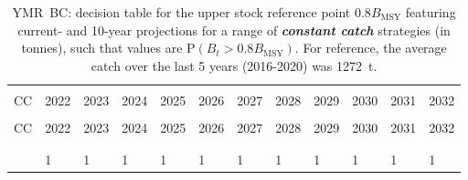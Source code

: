 \documentclass[11pt]{book}
\newcommand{\Bmsy}{B_\mathrm{MSY}}
\newcommand{\itbf}[1]{\textit{\textbf{#1}}}
\begin{document}
\begin{longtable}[c]{>{\raggedright\let\newline\\\arraybackslash\hspace{0pt}}p{0.48in}>{\raggedleft\let\newline\\\arraybackslash\hspace{0pt}}p{0.48in}>{\raggedleft\let\newline\\\arraybackslash\hspace{0pt}}p{0.48in}>{\raggedleft\let\newline\\\arraybackslash\hspace{0pt}}p{0.51in}>{\raggedleft\let\newline\\\arraybackslash\hspace{0pt}}p{0.51in}>{\raggedleft\let\newline\\\arraybackslash\hspace{0pt}}p{0.51in}>{\raggedleft\let\newline\\\arraybackslash\hspace{0pt}}p{0.51in}>{\raggedleft\let\newline\\\arraybackslash\hspace{0pt}}p{0.51in}>{\raggedleft\let\newline\\\arraybackslash\hspace{0pt}}p{0.51in}>{\raggedleft\let\newline\\\arraybackslash\hspace{0pt}}p{0.51in}>{\raggedleft\let\newline\\\arraybackslash\hspace{0pt}}p{0.51in}>{\raggedleft\let\newline\\\arraybackslash\hspace{0pt}}p{0.51in}}
  \caption{YMR~BC: decision table for the upper stock reference point $0.8 \Bmsy$ featuring current- and 10-year projections for a range of \itbf{constant catch} strategies (in tonnes), such that values are P$(B_t > 0.8 \Bmsy)$.  For reference, the average catch over the last 5 years (2016-2020) was 1272~t. } \label{tab:ymr.gmu.USR.CCs}\\  \hline\\[-2.2ex]  CC  & 2022 & 2023 & 2024 & 2025 & 2026 & 2027 & 2028 & 2029 & 2030 & 2031 & 2032 \\[0.2ex]\hline\\[-1.5ex]  \endfirsthead   \hline  CC  & 2022 & 2023 & 2024 & 2025 & 2026 & 2027 & 2028 & 2029 & 2030 & 2031 & 2032 \\[0.2ex]\hline\\[-1.5ex]  \endhead  \hline\\[-2.2ex]   \endfoot  \hline \endlastfoot  0 & 1 & 1 & 1 & 1 & 1 & 1 & 1 & 1 & 1 & 1 & 1 \\ 

\end{longtable}
\end{document}
